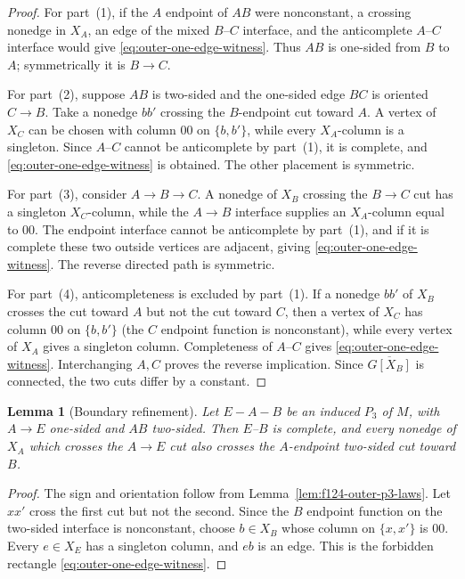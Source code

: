 \documentclass[11pt]{article}
\numberwithin{equation}{section}
\theoremstyle{plain}
\newtheorem{lemma}[theorem]{Lemma}
\theoremstyle{definition}
\begin{document}
\begin{proof}
For part~(1), if the $A$ endpoint of $AB$ were nonconstant, a crossing
nonedge in $X_A$, an edge of the mixed $B$--$C$ interface, and the
anticomplete $A$--$C$ interface would give
\eqref{eq:outer-one-edge-witness}.  Thus $AB$ is
one-sided from $B$ to $A$; symmetrically it is $B\to C$.

For part~(2), suppose $AB$ is two-sided and the one-sided edge $BC$ is oriented
$C\to B$.  Take a nonedge $bb'$ crossing the $B$-endpoint cut toward
$A$.  A vertex of $X_C$ can be chosen with column $00$ on
$\{b,b'\}$, while every $X_A$-column is a singleton.  Since $A$--$C$
cannot be anticomplete by part~(1), it is complete, and
\eqref{eq:outer-one-edge-witness} is obtained.
The other placement is symmetric.

For part~(3), consider $A\to B\to C$.  A nonedge of $X_B$ crossing the
$B\to C$ cut has a singleton $X_C$-column, while the $A\to B$
interface supplies an $X_A$-column equal to $00$.  The endpoint
interface cannot be anticomplete by part~(1), and if it is complete these
two outside vertices are adjacent, giving
\eqref{eq:outer-one-edge-witness}.  The reverse directed
path is symmetric.

For part~(4), anticompleteness is excluded by part~(1).  If a nonedge $bb'$ of
$X_B$ crosses the cut toward $A$ but not the cut toward $C$, then a
vertex of $X_C$ has column $00$ on $\{b,b'\}$ (the $C$ endpoint
function is nonconstant), while every vertex of $X_A$ gives a singleton
column.  Completeness of $A$--$C$ gives
\eqref{eq:outer-one-edge-witness}.  Interchanging $A,C$
proves the reverse implication.  Since $\overline{G[X_B]}$ is connected,
the two cuts differ by a constant.
\end{proof}

\begin{lemma}[Boundary refinement]
\label{lem:f124-boundary-refinement}
Let $E-A-B$ be an induced $P_3$ of $M$, with $A\to E$ one-sided and
$AB$ two-sided.  Then $E$--$B$ is complete, and every nonedge of $X_A$
which crosses the $A\to E$ cut also crosses the $A$-endpoint two-sided cut
toward $B$.
\end{lemma}

\begin{proof}
The sign and orientation follow from
Lemma~\ref{lem:f124-outer-p3-laws}.  Let $xx'$ cross the first cut but
not the second.  Since the $B$ endpoint function on the two-sided interface
is nonconstant, choose $b\in X_B$ whose column on $\{x,x'\}$ is $00$.
Every $e\in X_E$ has a singleton column, and $eb$ is an edge.  This is
the forbidden rectangle \eqref{eq:outer-one-edge-witness}.
\end{proof}
\end{document}

